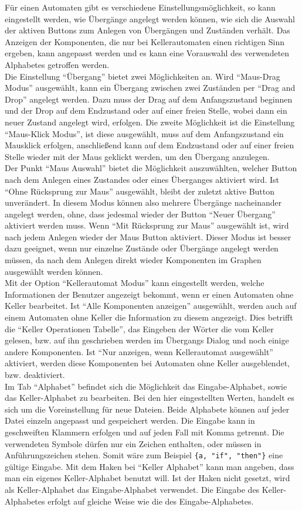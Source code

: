 Für einen Automaten gibt es verschiedene Einstellungsmöglichkeit, so kann
eingestellt werden, wie Übergänge angelegt werden können, wie sich die
Auswahl der aktiven Buttons zum Anlegen von Übergängen und Zuständen verhält.
Das Anzeigen der Komponenten, die nur bei Kellerautomaten einen richtigen Sinn
ergeben, kann angepasst werden und es kann eine Vorauswahl des verwendeten
Alphabetes getroffen werden.\\
Die Einstellung "`Übergang"' bietet zwei Möglichkeiten an. Wird "`Maus-Drag Modus"'
ausgewählt, kann ein Übergang zwischen zwei Zuständen per "`Drag and Drop"' angelegt
werden. Dazu muss der Drag auf dem Anfangszustand beginnen und der Drop auf dem
Endzustand oder auf einer freien Stelle, wobei dann ein neuer Zustand angelegt wird,
erfolgen. Die zweite Möglichkeit ist die Einstellung "`Maus-Klick Modus"', ist diese
ausgewählt, muss auf dem Anfangszustand ein Mausklick erfolgen, anschließend kann auf
dem Endzustand oder auf einer freien Stelle wieder mit der Maus geklickt werden,
um den Übergang anzulegen.\\
Der Punkt "`Maus Auswahl"' bietet die Möglichkeit auszuwählten, welcher Button nach
dem Anlegen eines Zustandes oder eines Überganges aktiviert wird. Ist "`Ohne
Rücksprung zur Maus"' ausgewählt, bleibt der zuletzt aktive Button unverändert.
In diesem Modus können also mehrere Übergänge nacheinander angelegt werden, ohne,
dass jedesmal wieder der Button "`Neuer Übergang"' aktiviert werden muss. Wenn
"`Mit Rücksprung zur Maus"' ausgewählt ist, wird nach jedem Anlegen wieder der
Maus Button aktiviert. Dieser Modus ist besser dazu geeignet, wenn nur einzelne
Zustände oder Übergänge angelegt werden müssen, da nach dem Anlegen direkt wieder
Komponenten im Graphen ausgewählt werden können.\\
Mit der Option "`Kellerautomat Modus"' kann eingestellt werden, welche Informationen
der Benutzer angezeigt bekommt, wenn er einen Automaten ohne Keller bearbeitet. Ist
"`Alle Komponenten anzeigen"' ausgewählt, werden auch auf einem Automaten ohne Keller
die Information zu diesem angezeigt. Dies betrifft die "`Keller Operationen Tabelle"',
das Eingeben der Wörter die vom Keller gelesen, bzw. auf ihn geschrieben werden im
Übergangs Dialog und noch einige andere Komponenten. Ist "`Nur anzeigen, wenn
Kellerautomat ausgewählt"' aktiviert, werden diese Komponenten bei Automaten ohne
Keller ausgeblendet, bzw. deaktiviert.\\
Im Tab "`Alphabet"' befindet sich die Möglichkeit das Eingabe-Alphabet, sowie das
Keller-Alphabet zu bearbeiten. Bei den hier eingestellten Werten, handelt es sich
um die Voreinstellung für neue Dateien. Beide Alphabete können auf jeder Datei
einzeln angepasst und gespeichert werden. Die Eingabe kann in geschweiften Klammern
erfolgen und auf jeden Fall mit Komma getrennt. Die verwendeten Symbole dürfen nur
ein Zeichen enthalten, oder müssen in Anführungszeichen stehen. Somit wäre zum
Beispiel \verb+{a, "if", "then"}+ eine gültige Eingabe. Mit dem Haken bei "`Keller
Alphabet"' kann man angeben, dass man ein eigenes Keller-Alphabet benutzt will.
Ist der Haken nicht gesetzt, wird als Keller-Alphabet das Eingabe-Alphabet
verwendet. Die Eingabe des Keller-Alphabetes erfolgt auf gleiche Weise wie die
des Eingabe-Alphabetes.


